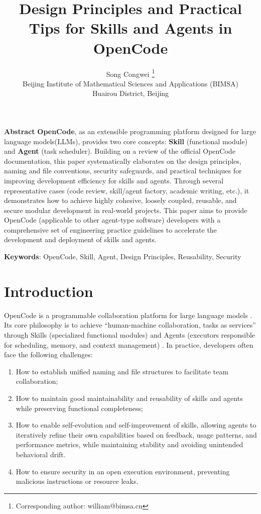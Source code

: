 \documentclass[]{article}
\title{\textbf{Design Principles and Practical Tips for Skills and Agents in OpenCode}}
\author{Song Congwei \thanks{Corresponding author: william@bimsa.cn}\\
Beijing Institute of Mathematical Sciences and Applications (BIMSA)\\
Huairou District, Beijing}
\date{}
\newcommand{\myline}{\begin{center}\rule{0.5\linewidth}{0.5pt}\end{center}}
\begin{document}
\maketitle

\noindent\textbf{Abstract}\hspace{0.5em} \textbf{OpenCode}, as an extensible programming platform
designed for large language models(LLMs), provides two core concepts:
\textbf{Skill} (functional module) and \textbf{Agent} (task scheduler).
Building on a review of the official OpenCode documentation, this paper
systematically elaborates on the design principles, naming and file
conventions, security safeguards, and practical techniques for improving
development efficiency for skills and agents. Through several
representative cases (code review, skill/agent factory, academic
writing, etc.), it demonstrates how to achieve highly cohesive, loosely
coupled, reusable, and secure modular development in real-world
projects. This paper aims to provide OpenCode (applicable to other agent-type software) developers with a
comprehensive set of engineering practice guidelines to accelerate the
development and deployment of skills and agents.

\textbf{Keywords}: OpenCode, Skill, Agent, Design Principles,
Reusability, Security


\section{Introduction}\label{sec:introduction}

OpenCode is a programmable collaboration platform for large language
models \cite{opencode-docs,lognroll-2026}. Its core philosophy is to
achieve ``human-machine collaboration, tasks as services'' through
Skills (specialized functional modules)
\cite{agent-skills,anthropic-skills,clawhub,skill-fish,skills-sh,jiang2026,xu2026agent} and
Agents (executors responsible for scheduling, memory, and context
management) \cite{luo2025large,li2026single}. In practice, developers often face
the following challenges:

\begin{enumerate}
\item
  How to establish unified naming and file structures to facilitate team
  collaboration;
\item
  How to maintain good maintainability and reusability of skills and
  agents while preserving functional completeness;
\item
  How to enable self-evolution and self-improvement of skills, allowing
  agents to iteratively refine their own capabilities based on feedback,
  usage patterns, and performance metrics, while maintaining stability
  and avoiding unintended behavioral drift.
\item
  How to ensure security in an open execution environment, preventing
  malicious instructions or resource leaks.
\end{enumerate}
\end{document}
